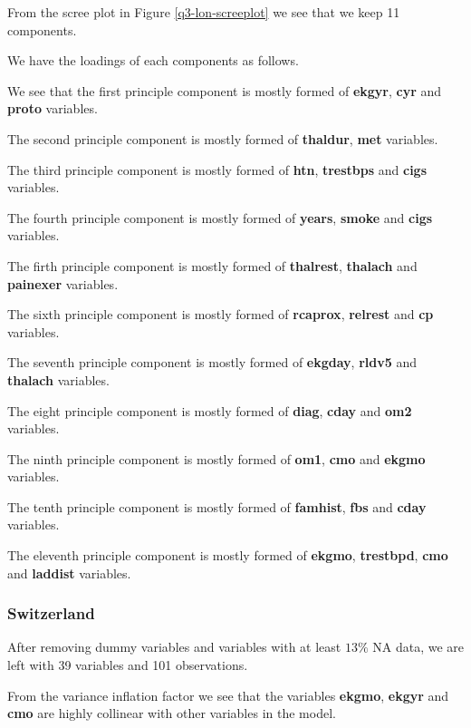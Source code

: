 \documentclass[a4paper]{article}
\begin{document}
From the scree plot in Figure \ref{q3-lon-screeplot} we see that we keep 11 components.

We have the loadings of each components as follows.



We see that the first principle component is mostly formed of \textbf{ekgyr}, \textbf{cyr} and \textbf{proto} variables.

The second principle component is mostly formed of \textbf{thaldur}, \textbf{met} variables.

The third principle component is mostly formed of \textbf{htn}, \textbf{trestbps} and \textbf{cigs} variables.

The fourth principle component is mostly formed of \textbf{years}, \textbf{smoke} and \textbf{cigs} variables.

The firth principle component is mostly formed of \textbf{thalrest}, \textbf{thalach} and \textbf{painexer} variables.

The sixth principle component is mostly formed of \textbf{rcaprox}, \textbf{relrest} and \textbf{cp} variables.

The seventh principle component is mostly formed of \textbf{ekgday}, \textbf{rldv5} and \textbf{thalach} variables.

The eight principle component is mostly formed of \textbf{diag}, \textbf{cday} and \textbf{om2} variables.

The ninth principle component is mostly formed of \textbf{om1}, \textbf{cmo} and \textbf{ekgmo} variables.

The tenth principle component is mostly formed of \textbf{famhist}, \textbf{fbs} and \textbf{cday} variables.

The eleventh principle component is mostly formed of \textbf{ekgmo}, \textbf{trestbpd}, \textbf{cmo} and \textbf{laddist} variables.

\subsubsection{Switzerland}

After removing dummy variables and variables with at least $13\%$ NA data, we are left with 39 variables and 101 observations.



From the variance inflation factor we see that the variables \textbf{ekgmo}, \textbf{ekgyr} and \textbf{cmo} are highly collinear with other variables in the model.
\end{document}
